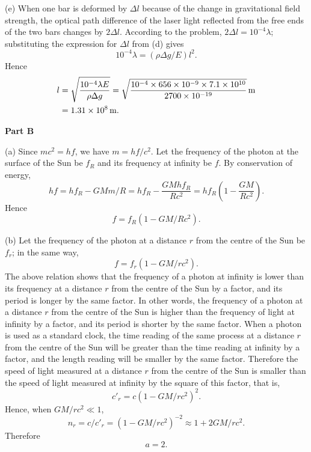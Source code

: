 (e) When one bar is deformed by $\Delta l$ because of the change in gravitational field strength, the optical path difference of the laser light reflected from the free ends of the two bars changes by $2\Delta l$. According to the problem, $2\Delta l=10^{-4}\lambda$; substituting the expression for $\Delta l$ from (d) gives
\begin{equation*}
10^{-4}\lambda=(\rho\Delta g/E)l^2 .
\end{equation*}
Hence
\begin{align*}
l&=\sqrt{\frac{10^{-4}\lambda E}{\rho\Delta g}}
=\sqrt{\frac{10^{-4}\times656\times10^{-9}\times7.1\times10^{10}}
{2700\times10^{-19}}}\,\mathrm{m}\\
&=1.31\times10^{8}\,\mathrm{m} .
\end{align*}

\textbf{Part B}

(a) Since $mc^2=hf$, we have $m=hf/c^2$. Let the frequency of the photon at the surface of the Sun be $f_R$ and its frequency at infinity be $f$. By conservation of energy,
\begin{equation*}
hf=hf_R-GMm/R=hf_R-\frac{GMhf_R}{Rc^2}
=hf_R\left(1-\frac{GM}{Rc^2}\right).
\end{equation*}
Hence
\begin{equation*}
f=f_R\left(1-GM/Rc^2\right).
\end{equation*}

(b) Let the frequency of the photon at a distance $r$ from the centre of the Sun be $f_r$; in the same way,
\begin{equation*}
f=f_r\left(1-GM/rc^2\right).
\end{equation*}
The above relation shows that the frequency of a photon at infinity is lower than its frequency at a distance $r$ from the centre of the Sun by a factor, and its period is longer by the same factor. In other words, the frequency of a photon at a distance $r$ from the centre of the Sun is higher than the frequency of light at infinity by a factor, and its period is shorter by the same factor. When a photon is used as a standard clock, the time reading of the same process at a distance $r$ from the centre of the Sun will be greater than the time reading at infinity by a factor, and the length reading will be smaller by the same factor. Therefore the speed of light measured at a distance $r$ from the centre of the Sun is smaller than the speed of light measured at infinity by the square of this factor, that is,
\begin{equation*}
c'_r=c\left(1-GM/rc^2\right)^2 .
\end{equation*}
Hence, when $GM/rc^2\ll1$,
\begin{equation*}
n_r=c/c'_r=\left(1-GM/rc^2\right)^{-2}\approx1+2GM/rc^2 .
\end{equation*}
Therefore
\begin{equation*}
a=2 .
\end{equation*}


